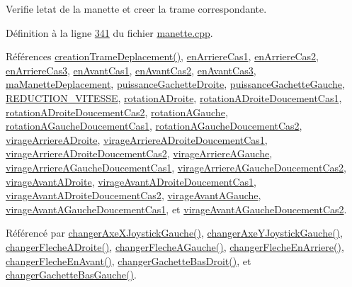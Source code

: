 Verifie l\textquotesingle{}etat de la manette et creer la trame correspondante. 



Définition à la ligne \hyperlink{manette_8cpp_source_l00341}{341} du fichier \hyperlink{manette_8cpp_source}{manette.\+cpp}.



Références \hyperlink{class_manette_a4151ee98538d58d2dde6c8027e9ef512}{creation\+Trame\+Deplacement()}, \hyperlink{manette_8h_source_l00224}{en\+Arriere\+Cas1}, \hyperlink{manette_8h_source_l00225}{en\+Arriere\+Cas2}, \hyperlink{manette_8h_source_l00226}{en\+Arriere\+Cas3}, \hyperlink{manette_8h_source_l00221}{en\+Avant\+Cas1}, \hyperlink{manette_8h_source_l00222}{en\+Avant\+Cas2}, \hyperlink{manette_8h_source_l00223}{en\+Avant\+Cas3}, \hyperlink{manette_8h_source_l00220}{ma\+Manette\+Deplacement}, \hyperlink{manette_8h_source_l00255}{puissance\+Gachette\+Droite}, \hyperlink{manette_8h_source_l00256}{puissance\+Gachette\+Gauche}, \hyperlink{manette_8h_source_l00026}{R\+E\+D\+U\+C\+T\+I\+O\+N\+\_\+\+V\+I\+T\+E\+S\+SE}, \hyperlink{manette_8h_source_l00230}{rotation\+A\+Droite}, \hyperlink{manette_8h_source_l00231}{rotation\+A\+Droite\+Doucement\+Cas1}, \hyperlink{manette_8h_source_l00232}{rotation\+A\+Droite\+Doucement\+Cas2}, \hyperlink{manette_8h_source_l00227}{rotation\+A\+Gauche}, \hyperlink{manette_8h_source_l00228}{rotation\+A\+Gauche\+Doucement\+Cas1}, \hyperlink{manette_8h_source_l00229}{rotation\+A\+Gauche\+Doucement\+Cas2}, \hyperlink{manette_8h_source_l00242}{virage\+Arriere\+A\+Droite}, \hyperlink{manette_8h_source_l00243}{virage\+Arriere\+A\+Droite\+Doucement\+Cas1}, \hyperlink{manette_8h_source_l00244}{virage\+Arriere\+A\+Droite\+Doucement\+Cas2}, \hyperlink{manette_8h_source_l00239}{virage\+Arriere\+A\+Gauche}, \hyperlink{manette_8h_source_l00240}{virage\+Arriere\+A\+Gauche\+Doucement\+Cas1}, \hyperlink{manette_8h_source_l00241}{virage\+Arriere\+A\+Gauche\+Doucement\+Cas2}, \hyperlink{manette_8h_source_l00236}{virage\+Avant\+A\+Droite}, \hyperlink{manette_8h_source_l00237}{virage\+Avant\+A\+Droite\+Doucement\+Cas1}, \hyperlink{manette_8h_source_l00238}{virage\+Avant\+A\+Droite\+Doucement\+Cas2}, \hyperlink{manette_8h_source_l00233}{virage\+Avant\+A\+Gauche}, \hyperlink{manette_8h_source_l00234}{virage\+Avant\+A\+Gauche\+Doucement\+Cas1}, et \hyperlink{manette_8h_source_l00235}{virage\+Avant\+A\+Gauche\+Doucement\+Cas2}.



Référencé par \hyperlink{manette_8cpp_source_l00421}{changer\+Axe\+X\+Joystick\+Gauche()}, \hyperlink{manette_8cpp_source_l00438}{changer\+Axe\+Y\+Joystick\+Gauche()}, \hyperlink{manette_8cpp_source_l00542}{changer\+Fleche\+A\+Droite()}, \hyperlink{manette_8cpp_source_l00533}{changer\+Fleche\+A\+Gauche()}, \hyperlink{manette_8cpp_source_l00524}{changer\+Fleche\+En\+Arriere()}, \hyperlink{manette_8cpp_source_l00515}{changer\+Fleche\+En\+Avant()}, \hyperlink{manette_8cpp_source_l00504}{changer\+Gachette\+Bas\+Droit()}, et \hyperlink{manette_8cpp_source_l00493}{changer\+Gachette\+Bas\+Gauche()}.


